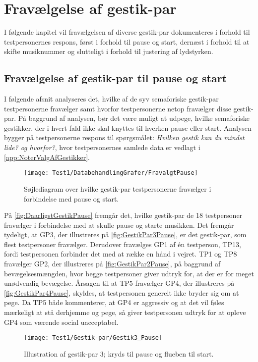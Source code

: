 \chapter{Fravælgelse af gestik-par}
\label{app:TestresultaterFravaelgelse}
%
I følgende kapitel vil fravælgelsen af diverse gestik-par dokumenteres i forhold til testpersonernes respons, først i forhold til pause og start, dernæst i forhold til at skifte musiknummer og slutteligt i forhold til justering af lydstyrken. 
%
\section{Fravælgelse af gestik-par til pause og start}
\label{app:TestresultaterPauseDaarlig} 
%
I følgende afsnit analyseres det, hvilke af de syv semaforiske gestik-par testpersonerne fravælger samt hvorfor testpersonerne netop fravælger disse gestik-par. På baggrund af analysen, bør det være muligt at udpege, hvilke semaforiske gestikker, der i hvert fald ikke skal knyttes til hverken pause eller start. Analysen bygger på testpersonerne respons til spørgsmålet: \textit{Hvilken gestik kan du mindst lide? og hvorfor?}, hvor testpersonernes samlede data er vedlagt i \autoref{app:NoterValgAfGestikker}.
%
\begin{figure}[H]
	\centering
	\texttt{[image: Test1/DatabehandlingGrafer/FravalgtPause]}
	\caption{Søjlediagram over hvilke gestik-par testpersonerne fravælger i forbindelse med pause og start.}
	\label{fig:DaarligstGestikPause}
\end{figure}
\noindent
% 
På \autoref{fig:DaarligstGestikPause} fremgår det, hvilke gestik-par de 18 testpersoner fravælger i forbindelse med at skulle pause og starte musikken. Det fremgår tydeligt, at GP3, der illustreres på \autoref{fig:GestikPar3Pause}, er det gestik-par, som flest testpersoner fravælger. Derudover fravælges GP1 af én testperson, TP13, fordi testpersonen forbinder det med at række en hånd i vejret. TP1 og TP8 fravælger GP2, der illustreres på \autoref{fig:GestikPar2Pause}, på baggrund af bevægelsesmængden, hvor begge testpersoner giver udtryk for, at der er for meget unødvendig bevægelse. Årsagen til at TP5 fravælger GP4, der illustreres på \autoref{fig:GestikPar4Pause}, skyldes, at testpersonen generelt ikke bryder sig om at pege. Da TP5 både kommenterer, at GP4 er aggressiv og at det vil føles mærkeligt at stå derhjemme og pege, så giver testpersonen udtryk for at opleve GP4 som værende social uacceptabel. 
%
\begin{figure}[H]
	\centering
	\texttt{[image: Test1/Gestik-par/Gestik3\_Pause]}
	\caption{Illustration af gestik-par 3; kryds til pause og flueben til start.}
	\label{fig:GestikPar3Pause}
\end{figure}
